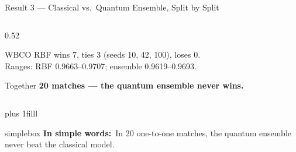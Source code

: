 \documentclass[aspectratio=169,11pt,t,xcolor={table}]{beamer}
\newcommand{\insimple}[1]{%
  \par\vskip 0pt plus 1filll
  \begin{beamercolorbox}[wd=\textwidth,sep=4pt,rounded=true]{simplebox}%
    \small\textbf{\textcolor{qamber!75!black}{In simple words:}}\ #1%
  \end{beamercolorbox}\vskip1pt}
\begin{document}
\begin{frame}{Result 3 --- Classical vs.\ Quantum Ensemble, Split by Split}
\begin{columns}[T,onlytextwidth]
\begin{column}{0.52\textwidth}
      \begin{block}{WBCO}
        \footnotesize RBF wins 7, ties 3 (seeds 10, 42, 100), loses 0.\\ Ranges: RBF 0.9663--0.9707; ensemble 0.9619--0.9693.
      \end{block}
      \begin{alertblock}{Together}
        \footnotesize\textbf{20 matches --- the quantum ensemble never wins.}
      \end{alertblock}
    \end{column}
  \end{columns}
  \insimple{In 20 one-to-one matches, the quantum ensemble never beat the classical model.}
\end{frame}
\end{document}
